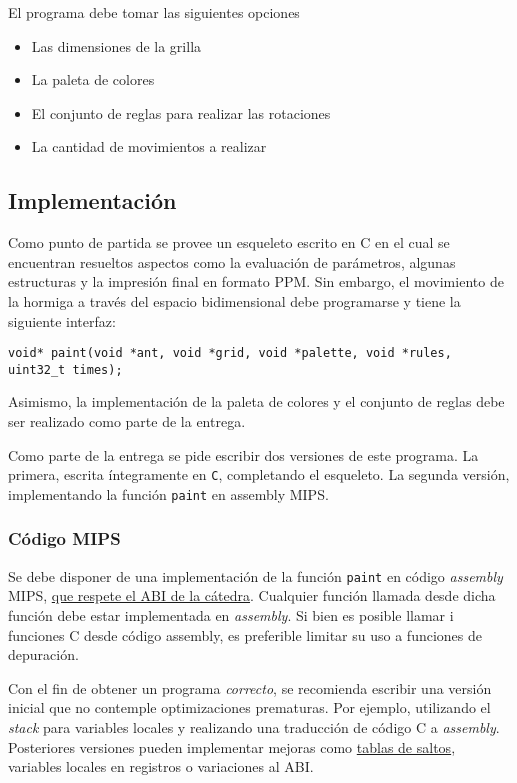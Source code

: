 \documentclass{article}
\begin{document}
El programa debe tomar las siguientes opciones
\begin{itemize}
\item Las dimensiones de la grilla
\item La paleta de colores
\item El conjunto de reglas para realizar las rotaciones
\item La cantidad de movimientos a realizar
\end{itemize}


\subsection{Implementación}
Como punto de partida se provee un esqueleto escrito en C en el cual se encuentran resueltos aspectos como la evaluación de parámetros, 
algunas estructuras y la impresión final en formato PPM.  Sin embargo, el movimiento de la hormiga a través del
espacio bidimensional debe programarse y tiene la siguiente interfaz:

\begin{small}
\begin{verbatim}
void* paint(void *ant, void *grid, void *palette, void *rules,  uint32_t times);
\end{verbatim}
\end{small}

Asimismo, la implementación de la paleta de colores y el conjunto de reglas debe ser realizado como parte de la entrega.

Como parte de la entrega se pide escribir dos versiones de este programa. La primera, escrita íntegramente en \texttt{C}, completando
el esqueleto. La segunda versión, implementando la función \texttt{paint} en assembly MIPS.

\subsubsection{Código MIPS}
Se debe disponer de una implementación de la función \texttt{paint} en código \textit{assembly} MIPS, \underline{que respete el ABI 
de la cátedra}. Cualquier función llamada desde dicha función debe estar implementada en \textit{assembly}. Si bien es posible llamar i
funciones C desde código assembly, es preferible limitar su uso a funciones de depuración.

Con el fin de obtener un programa \textit{correcto}, se recomienda escribir una versión inicial que no contemple
optimizaciones prematuras. Por ejemplo, utilizando el \textit{stack} para variables locales y realizando una traducción
de código C a \textit{assembly}. Posteriores versiones pueden implementar mejoras como \underline{tablas de saltos},
variables locales en registros o variaciones al ABI.
\end{document}
